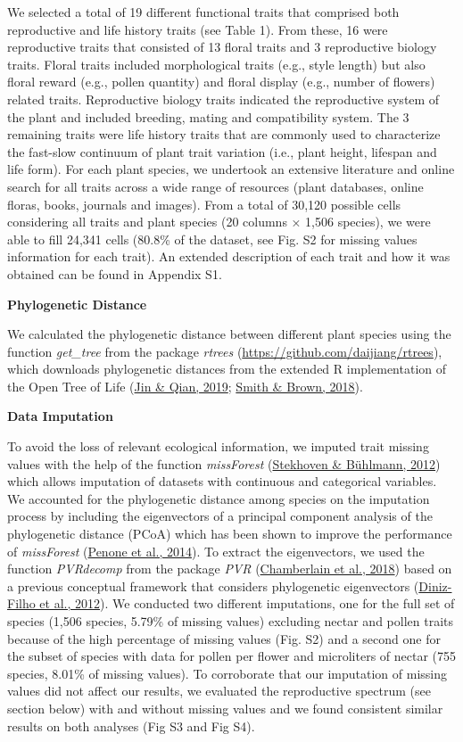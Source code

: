 \documentclass[
  12pt,
  a4paper,
]{article}
\begin{document}
We selected a total of 19 different functional traits that comprised both reproductive and life history traits (see Table 1). From these, 16 were reproductive traits that consisted of 13 floral traits and 3 reproductive biology traits. Floral traits included morphological traits (e.g., style length) but also floral reward (e.g., pollen quantity) and floral display (e.g., number of flowers) related traits. Reproductive biology traits indicated the reproductive system of the plant and included breeding, mating and compatibility system. The 3 remaining traits were life history traits that are commonly used to characterize the fast-slow continuum of plant trait variation (i.e., plant height, lifespan and life form). For each plant species, we undertook an extensive literature and online search for all traits across a wide range of resources (plant databases, online floras, books, journals and images). From a total of 30,120 possible cells considering all traits and plant species (20 columns × 1,506 species), we were able to fill 24,341 cells (80.8\% of the dataset, see Fig. S2 for missing values information for each trait). An extended description of each trait and how it was obtained can be found in Appendix S1.

\textbf{Phylogenetic Distance}

We calculated the phylogenetic distance between different plant species using the function \emph{get\_tree} from the package \emph{rtrees} (\url{https://github.com/daijiang/rtrees}), which downloads phylogenetic distances from the extended R implementation of the Open Tree of Life (\protect\hyperlink{ref-jin2019}{Jin \& Qian, 2019}; \protect\hyperlink{ref-smith2018}{Smith \& Brown, 2018}).

\textbf{Data Imputation}

To avoid the loss of relevant ecological information, we imputed trait missing values with the help of the function \emph{missForest} (\protect\hyperlink{ref-stekhoven2012}{Stekhoven \& Bühlmann, 2012}) which allows imputation of datasets with continuous and categorical variables. We accounted for the phylogenetic distance among species on the imputation process by including the eigenvectors of a principal component analysis of the phylogenetic distance (PCoA) which has been shown to improve the performance of \emph{missForest} (\protect\hyperlink{ref-penone2014}{Penone et al., 2014}). To extract the eigenvectors, we used the function \emph{PVRdecomp} from the package \emph{PVR} (\protect\hyperlink{ref-santos2018}{Chamberlain et al., 2018}) based on a previous conceptual framework that considers phylogenetic eigenvectors (\protect\hyperlink{ref-diniz-filho2012}{Diniz-Filho et al., 2012}). We conducted two different imputations, one for the full set of species (1,506 species, 5.79\% of missing values) excluding nectar and pollen traits because of the high percentage of missing values (Fig. S2) and a second one for the subset of species with data for pollen per flower and microliters of nectar (755 species, 8.01\% of missing values). To corroborate that our imputation of missing values did not affect our results, we evaluated the reproductive spectrum (see section below) with and without missing values and we found consistent similar results on both analyses (Fig S3 and Fig S4).
\end{document}
